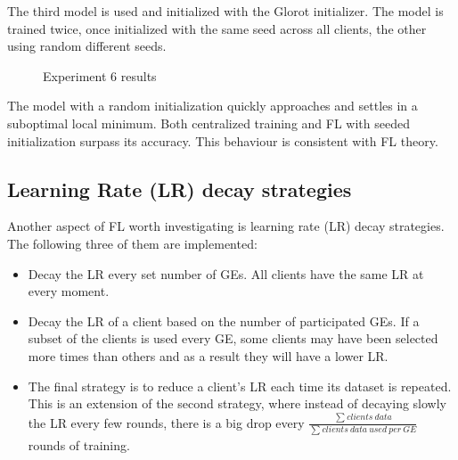 The third model is used and initialized with the Glorot initializer. The model is trained twice, once initialized with the same seed across all clients, the other using random different seeds.

\begin{figure}[H]
    \center
    
    \caption[Experiment 6 results]{Experiment 6 results}
    \label{fig:Experiment 6 results}
\end{figure}

The model with a random initialization quickly approaches and settles in a suboptimal local minimum. Both centralized training and FL with seeded initialization surpass its accuracy. This behaviour is consistent with FL theory.

\subsection{Learning Rate (LR) decay strategies}
Another aspect of FL worth investigating is learning rate (LR) decay strategies. The following three of them are implemented:
\begin{itemize}
    \item Decay the LR every set number of GEs. All clients have the same LR at every moment.
    \item Decay the LR of a client based on the number of participated GEs. If a subset of the clients is used every GE, some clients may have been selected more times than others and as a result they will have a lower LR.
    \item The final strategy is to reduce a client's LR each time its dataset is repeated. This is an extension of the second strategy, where instead of decaying slowly the LR every few rounds, there is a big drop every \( \displaystyle \frac{\sum_{}^{}clients\ data}{\sum_{}^{} clients\ data\ used\ per\ GE} \) rounds of training.
\end{itemize}

